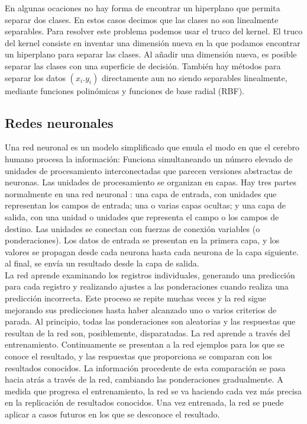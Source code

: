 \documentclass[conference]{IEEEtran}
\begin{document}
En algunas ocaciones no hay forma de encontrar un hiperplano que permita separar dos clases. En estos casos decimos que las clases no son linealmente separables. Para resolver este problema podemos usar el truco del kernel. El truco del kernel consiste en inventar una dimensión nueva en la que podamos encontrar un hiperplano para separar las clases. Al añadir una dimensión nueva, es posible separar las clases con una superficie de decisión. También hay métodos para separar los datos $(x_i. y_i)$ directamente aun no siendo separables linealmente, mediante funciones polinómicas y funciones de base radial (RBF).

\subsection{Redes neuronales}
Una red neuronal es un modelo simplificado que emula el modo en que el cerebro humano procesa la información: Funciona simultaneando un número elevado de unidades de procesamiento interconectadas que parecen versiones abstractas de neuronas. Las unidades de procesamiento se organizan en capas. Hay tres partes normalmente en una red neuronal : una capa de entrada, con unidades que representan los campos de entrada; una o varias capas ocultas; y una capa de salida, con una unidad o unidades que representa el campo o los campos de destino. Las unidades se conectan con fuerzas de conexión variables (o ponderaciones). Los datos de entrada se presentan en la primera capa, y los valores se propagan desde cada neurona hasta cada neurona de la capa siguiente. al final, se envía un resultado desde la capa de salida.\\

La red aprende examinando los registros individuales, generando una predicción para cada registro y realizando ajustes a las ponderaciones cuando realiza una predicción incorrecta. Este proceso se repite muchas veces y la red sigue mejorando sus predicciones hasta haber alcanzado uno o varios criterios de parada. Al principio, todas las ponderaciones son aleatorias y las respuestas que resultan de la red son, posiblemente, disparatadas. La red aprende a través del entrenamiento. Continuamente se presentan a la red ejemplos para los que se conoce el resultado, y las respuestas que proporciona se comparan con los resultados conocidos. La información procedente de esta comparación se pasa hacia atrás a través de la red, cambiando las ponderaciones gradualmente. A medida que progresa el entrenamiento, la red se va haciendo cada vez más precisa en la replicación de resultados conocidos. Una vez entrenada, la red se puede aplicar a casos futuros en los que se desconoce el resultado.
\end{document}
